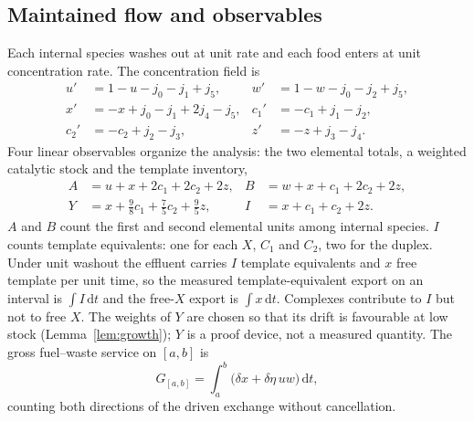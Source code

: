 \documentclass[11pt,a4paper]{article}
\theoremstyle{plain}
\theoremstyle{definition}
\theoremstyle{remark}
\newcommand{\dd}{\,\mathrm d}
\newcommand{\Iv}{I}
\begin{document}
\subsection{Maintained flow and observables}\label{sec:flow}
Each internal species washes out at unit rate and each food enters at unit concentration rate. The concentration field is
\begin{equation}\label{eq:ode}
\begin{aligned}
u'&=1-u-j_0-j_1+j_5,&w'&=1-w-j_0-j_2+j_5,\\
x'&=-x+j_0-j_1+2j_4-j_5,&c_1'&=-c_1+j_1-j_2,\\
c_2'&=-c_2+j_2-j_3,&z'&=-z+j_3-j_4.
\end{aligned}
\end{equation}
Four linear observables organize the analysis: the two elemental totals, a weighted catalytic stock and the template inventory,
\begin{equation}\label{eq:observables}
\begin{aligned}
A&=u+x+2c_1+2c_2+2z,&B&=w+x+c_1+2c_2+2z,\\
Y&=x+\tfrac98c_1+\tfrac75c_2+\tfrac95z,&\Iv&=x+c_1+c_2+2z.
\end{aligned}
\end{equation}
$A$ and $B$ count the first and second elemental units among internal species. $\Iv$ counts template equivalents: one for each $X$, $C_1$ and $C_2$, two for the duplex. Under unit washout the effluent carries $\Iv$ template equivalents and $x$ free template per unit time, so the measured template-equivalent export on an interval is $\int\Iv\dd t$ and the free-$X$ export is $\int x\dd t$. Complexes contribute to $\Iv$ but not to free $X$. The weights of $Y$ are chosen so that its drift is favourable at low stock (Lemma~\ref{lem:growth}); $Y$ is a proof device, not a measured quantity. The gross fuel--waste service on $[a,b]$ is
\begin{equation}\label{eq:service}
G_{[a,b]}=\int_a^b\bigl(\delta x+\delta\eta\,uw\bigr)\dd t,
\end{equation}
counting both directions of the driven exchange without cancellation.
\end{document}
